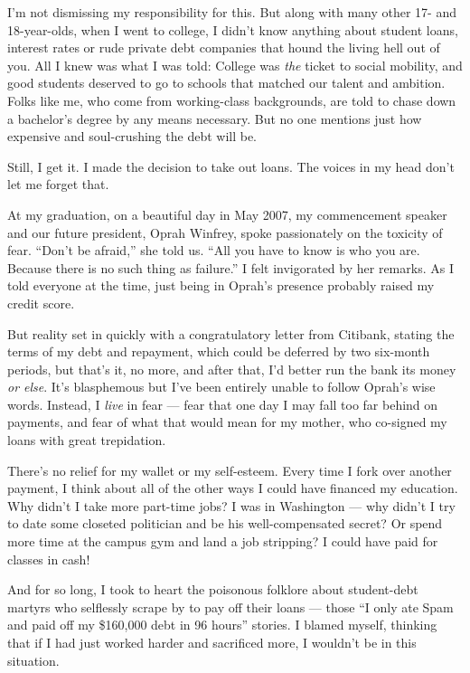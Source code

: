 I'm not dismissing my responsibility for this. But along with many other
17- and 18-year-olds, when I went to college, I didn't know anything
about student loans, interest rates or rude private debt companies that
hound the living hell out of you. All I knew was what I was told:
College was \emph{the} ticket to social mobility, and good students
deserved to go to schools that matched our talent and ambition. Folks
like me, who come from working-class backgrounds, are told to chase down
a bachelor's degree by any means necessary. But no one mentions just how
expensive and soul-crushing the debt will be.

Still, I get it. I made the decision to take out loans. The voices in my
head don't let me forget that.

At my graduation, on a beautiful day in May 2007, my commencement
speaker and our future president, Oprah Winfrey, spoke passionately on
the toxicity of fear. ``Don't be afraid,'' she told us. ``All you have
to know is who you are. Because there is no such thing as failure.'' I
felt invigorated by her remarks. As I told everyone at the time, just
being in Oprah's presence probably raised my credit score.

But reality set in quickly with a congratulatory letter from Citibank,
stating the terms of my debt and repayment, which could be deferred by
two six-month periods, but that's it, no more, and after that, I'd
better run the bank its money \emph{or else}. It's blasphemous but I've
been entirely unable to follow Oprah's wise words. Instead, I
\emph{live} in fear --- fear that one day I may fall too far behind on
payments, and fear of what that would mean for my mother, who co-signed
my loans with great trepidation.

There's no relief for my wallet or my self-esteem. Every time I fork
over another payment, I think about all of the other ways I could have
financed my education. Why didn't I take more part-time jobs? I was in
Washington --- why didn't I try to date some closeted politician and be
his well-compensated secret? Or spend more time at the campus gym and
land a job stripping? I could have paid for classes in cash!

And for so long, I took to heart the poisonous folklore about
student-debt martyrs who selflessly scrape by to pay off their loans ---
those ``I only ate Spam and paid off my \$160,000 debt in 96 hours''
stories. I blamed myself, thinking that if I had just worked harder and
sacrificed more, I wouldn't be in this situation.


